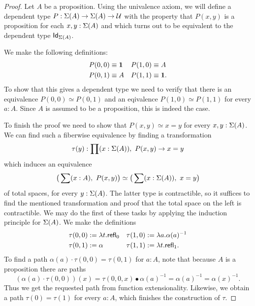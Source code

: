 \begin{proof}
Let $A$ be a proposition. Using the univalence axiom, we will define a 
dependent type $P:\Sigma(A)\to\Sigma(A)\to\mathcal{U}$ with the 
property that $P(x,y)$ is a proposition for each $x,y:\Sigma(A)$ 
and which turns out to be equivalent to the dependent type 
$\mathsf{Id}_{\Sigma(A)}$.

We make the following definitions:
\begin{align*}
P(0,0) & \equiv \mathbf{1} & P(1,0) & \equiv A\\
P(0,1) & \equiv A & P(1,1) & \equiv \mathbf{1}.
\end{align*}
To show that this gives a dependent type we need to verify that there 
is an equivalence $P(0,0)\simeq P(0,1)$ and an eqivalence 
$P(1,0)\simeq P(1,1)$ for every $a:A$. Since $A$ is assumed to 
be a proposition, this is indeed the case.

To finish the proof we need to show that $P(x,y)\simeq x=y$ 
for every $x,y:\Sigma(A)$. We can find such a fiberwise equivalence 
by finding a transformation
\begin{equation*}
\tau(y):\prod(x:\Sigma(A)),\ P(x,y)\to x=y
\end{equation*}
which induces an equivalence 
\begin{equation*}
\big(\sum(x:A),\ P(x,y)\big)\simeq\big(\sum(x:\susp(A)),\ x=y\big)
\end{equation*}
of total spaces, for every $y:\Sigma(A)$. The latter type 
is contractible, so it suffices to find the mentioned transformation 
and proof that the total space on the left is contractible. We may do 
the first of these tasks by applying the induction principle for 
$\Sigma(A)$. We make the definitions
\begin{align*}
\tau(0,0) & := \lambda t.\mathsf{refl}_{0} & \tau(1,0) &:= \lambda a.\alpha(a)^{-1}\\
\tau(0,1) & := \alpha & \tau(1,1) &:= \lambda t.\mathsf{refl}_{1}.
\end{align*}
To find a path $\alpha(a)\cdot\tau(0,0)=\tau(0,1)$ for $a:A$, 
note that because $A$ is a proposition there are paths
\begin{equation*}
(\alpha(a)\cdot\tau(0,0))(x)=\tau(0,0,x)\bullet\alpha(a)^{-1}
=\alpha(a)^{-1}= \alpha(x)^{-1}. 
\end{equation*}
Thus we get the requested path from function extensionality. Likewise, 
we obtain a path $\tau(0)=\tau(1)$ for every $a:A$, 
which finishes the construction of $\tau$.


\end{proof}
